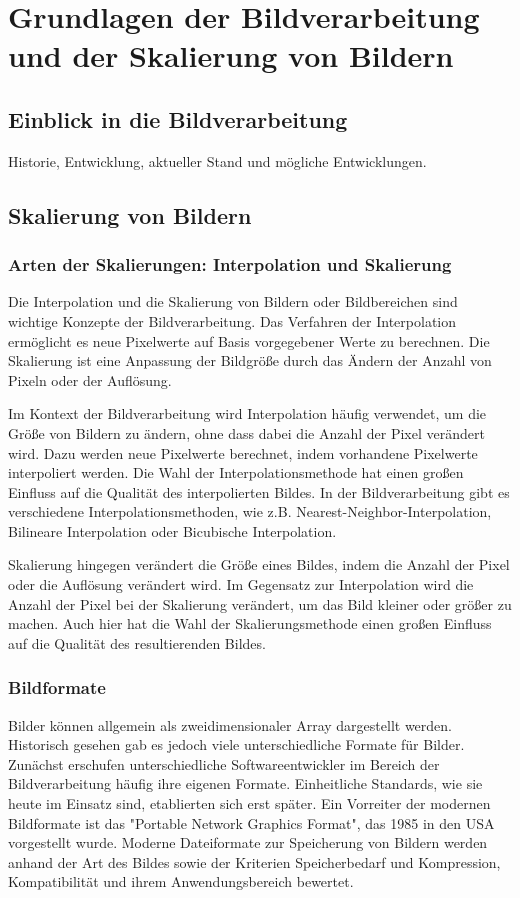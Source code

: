 



\chapter{Grundlagen der Bildverarbeitung und der Skalierung von Bildern}


\section{Einblick in die Bildverarbeitung}
Historie, Entwicklung, aktueller Stand und mögliche Entwicklungen.

\section{Skalierung von Bildern}

\subsection{Arten der Skalierungen: Interpolation und Skalierung}
Die Interpolation und die Skalierung von Bildern oder Bildbereichen sind wichtige Konzepte der Bildverarbeitung. 
Das Verfahren der Interpolation ermöglicht es neue Pixelwerte auf Basis vorgegebener Werte zu berechnen.
Die Skalierung ist eine Anpassung der Bildgröße durch das Ändern der Anzahl von Pixeln oder der Auflösung.

Im Kontext der Bildverarbeitung wird Interpolation häufig verwendet, um die Größe von Bildern zu ändern, ohne dass dabei die Anzahl der Pixel verändert wird. Dazu werden neue Pixelwerte berechnet, indem vorhandene Pixelwerte interpoliert werden. Die Wahl der Interpolationsmethode hat einen großen Einfluss auf die Qualität des interpolierten Bildes. In der Bildverarbeitung gibt es verschiedene Interpolationsmethoden, wie z.B. Nearest-Neighbor-Interpolation, Bilineare Interpolation oder Bicubische Interpolation.

Skalierung hingegen verändert die Größe eines Bildes, indem die Anzahl der Pixel oder die Auflösung verändert wird. Im Gegensatz zur Interpolation wird die Anzahl der Pixel bei der Skalierung verändert, um das Bild kleiner oder größer zu machen. Auch hier hat die Wahl der Skalierungsmethode einen großen Einfluss auf die Qualität des resultierenden Bildes.

\subsection{Bildformate}
Bilder können allgemein als zweidimensionaler Array dargestellt werden.
Historisch gesehen gab es jedoch viele unterschiedliche Formate für Bilder. Zunächst erschufen unterschiedliche Softwareentwickler im Bereich der Bildverarbeitung häufig ihre eigenen Formate.
Einheitliche Standards, wie sie heute im Einsatz sind, etablierten sich erst später.
Ein Vorreiter der modernen Bildformate ist das "Portable Network Graphics Format", das 1985 in den USA vorgestellt wurde. 
Moderne Dateiformate zur Speicherung von Bildern werden anhand der Art des Bildes sowie der Kriterien Speicherbedarf und Kompression, Kompatibilität und ihrem Anwendungsbereich bewertet. 
